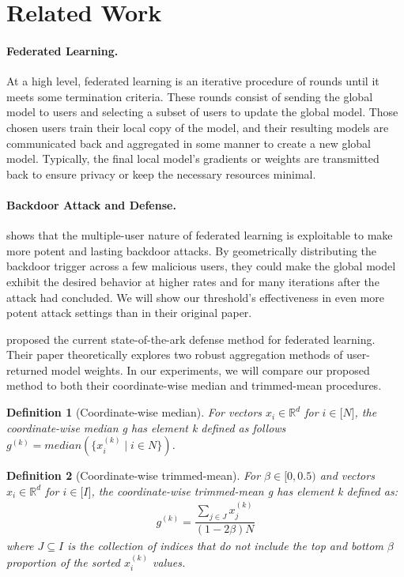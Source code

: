 \documentclass{article} %
\newtheorem{definition}{Definition}
\begin{document}
%
\section{Related Work}

\paragraph{Federated Learning.} At a high level, federated learning is an iterative procedure of rounds until it meets some termination criteria. These rounds consist of sending the global model to users and selecting a subset of users to update the global model. Those chosen users train their local copy of the model, and their resulting models are communicated back and aggregated in some manner to create a new global model. Typically, the final local model's gradients or weights are transmitted back to ensure privacy or keep the necessary resources minimal. 

\paragraph{Backdoor Attack and Defense.} \cite{dba} shows that the multiple-user nature of federated learning is exploitable to make more potent and lasting backdoor attacks. By geometrically distributing the backdoor trigger across a few malicious users, they could make the global model exhibit the desired behavior at higher rates and for many iterations after the attack had concluded. We will show our threshold's effectiveness in even more potent attack settings than in their original paper.

\cite{trim-mean} proposed the current state-of-the-ark defense method for federated learning. Their paper theoretically explores two robust aggregation methods of user-returned model weights. In our experiments, we will compare our proposed method to both their coordinate-wise median and trimmed-mean procedures.

\begin{definition}[Coordinate-wise median] 
For vectors $x_i \in \mathbb{R}^{d}$ for $i \in \mathopen[N\mathclose]$, the coordinate-wise median g has element k defined as follows $g^{(k)} = median(\{x_i^{(k)} \mid i \in N\})$.
\end{definition}

\begin{definition}[Coordinate-wise trimmed-mean]
For $\beta \in \mathopen[ 0, 0.5 \mathclose)$ and vectors $x_i \in \mathbb{R}^{d}$ for $i \in \mathopen[I\mathclose]$, the coordinate-wise trimmed-mean g has element k defined as:
\begin{align*}
g^{(k)} = \dfrac{\sum_{j \in J}{x_j^{(k)}}}{(1 - 2\beta)N}
\end{align*}
where $J \subseteq I$ is the collection of indices that do not include the top and bottom $\beta$ proportion of the sorted $x_i^{(k)}$ values.
\end{definition}
\end{document}
